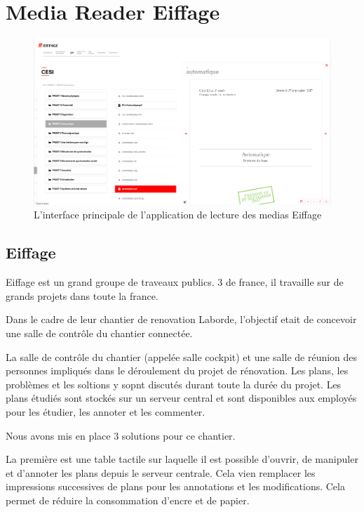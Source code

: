 \section{Media Reader Eiffage}

\begin{figure}[h]
    \centering
    \includegraphics[scale=0.5]{img/media-reader.png}
    \caption{L'interface principale de l'application de lecture des medias Eiffage}
\end{figure}

\subsection{Eiffage}

Eiffage est un grand groupe de traveaux publics.
3 de france, il travaille sur de grands projets dans toute la france.

Dans le cadre de leur chantier de renovation Laborde, l'objectif etait de concevoir une salle de contrôle du chantier connectée.

La salle de contrôle du chantier (appelée salle cockpit) et une salle de réunion des personnes impliqués dans le déroulement du projet de rénovation.
Les plans, les problèmes et les soltions y sopnt discutés durant toute la durée du projet.
Les plans étudiés sont stockés sur un serveur central et sont disponibles aux employés pour les étudier, les annoter et les commenter.

\medskip

Nous avons mis en place 3 solutions pour ce chantier.

La première est une table tactile sur laquelle il est possible d'ouvrir, de manipuler et d'annoter les plans depuis le serveur centrale.
Cela vien remplacer les impressions successives de plans pour les annotations et les modifications.
Cela permet de réduire la consommation d'encre et de papier.

